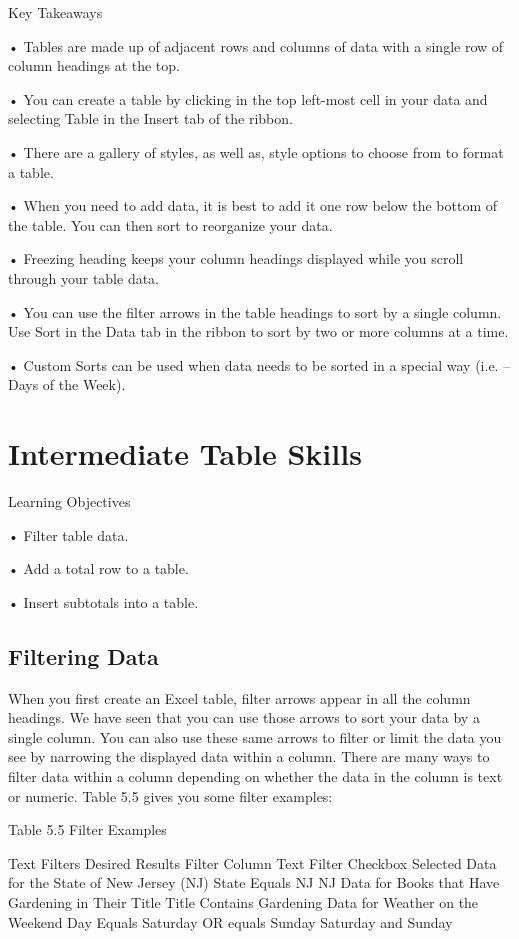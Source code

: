 Key Takeaways


• Tables are made up of adjacent rows and columns of data with a single row of column headings at the top.

• You can create a table by clicking in the top left-most cell in your data and selecting Table in the Insert tab of
the ribbon.

• There are a gallery of styles, as well as, style options to choose from to format a table.

• When you need to add data, it is best to add it one row below the bottom of the table. You can then sort to
reorganize your data.

• Freezing heading keeps your column headings displayed while you scroll through your table data.

• You can use the filter arrows in the table headings to sort by a single column. Use Sort in the Data tab in the
ribbon to sort by two or more columns at a time.

• Custom Sorts can be used when data needs to be sorted in a special way (i.e. – Days of the Week).



\section{Intermediate Table Skills}




Learning Objectives


• Filter table data.

• Add a total row to a table.

• Insert subtotals into a table.



\subsection{Filtering Data}

When you first create an Excel table, filter arrows appear in all the column headings. We have seen
that you can use those arrows to sort your data by a single column. You can also use these same arrows
to filter or limit the data you see by narrowing the displayed data within a column. There are many
ways to filter data within a column depending on whether the data in the column is text or numeric.
Table 5.5 gives you some filter examples:

Table 5.5 Filter Examples

Text Filters
Desired Results                                     Filter Column Text Filter                         Checkbox Selected
Data for the State of New Jersey (NJ)               State            Equals NJ                        NJ
Data for Books that Have Gardening in Their Title Title              Contains Gardening
Data for Weather on the Weekend                     Day              Equals Saturday OR equals Sunday Saturday and Sunday





